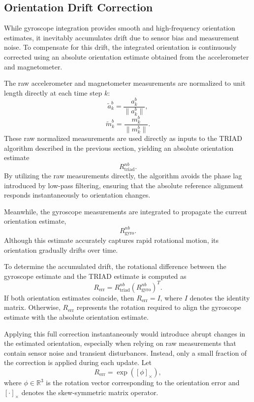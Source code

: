 \documentclass{article}
\begin{document}
\subsection{Orientation Drift Correction}

While gyroscope integration provides smooth and high-frequency orientation estimates, it inevitably accumulates drift due to sensor bias and measurement noise. To compensate for this drift, the integrated orientation is continuously corrected using an absolute orientation estimate obtained from the accelerometer and magnetometer.

The raw accelerometer and magnetometer measurements are normalized to unit length directly at each time step $k$:
\[
\tilde{a}_k^b = \frac{a_k^b}{\|a_k^b\|},
\]
\[
\tilde{m}_k^b = \frac{m_k^b}{\|m_k^b\|}.
\]
These raw normalized measurements are used directly as inputs to the TRIAD algorithm described in the previous section, yielding an absolute orientation estimate
\[
R_{\mathrm{triad}}^{nb}.
\]
By utilizing the raw measurements directly, the algorithm avoids the phase lag introduced by low-pass filtering, ensuring that the absolute reference alignment responds instantaneously to orientation changes.

Meanwhile, the gyroscope measurements are integrated to propagate the current orientation estimate,
\[
R_{\mathrm{gyro}}^{nb}.
\]
Although this estimate accurately captures rapid rotational motion, its orientation gradually drifts over time.

To determine the accumulated drift, the rotational difference between the gyroscope estimate and the TRIAD estimate is computed as
\[
R_{\mathrm{err}}
=
R_{\mathrm{triad}}^{nb}
\left(R_{\mathrm{gyro}}^{nb}\right)^T.
\]
If both orientation estimates coincide, then $R_{\mathrm{err}} = I$, where $I$ denotes the identity matrix. Otherwise, $R_{\mathrm{err}}$ represents the rotation required to align the gyroscope estimate with the absolute orientation estimate.

Applying this full correction instantaneously would introduce abrupt changes in the estimated orientation, especially when relying on raw measurements that contain sensor noise and transient disturbances. Instead, only a small fraction of the correction is applied during each update. Let
\[
R_{\mathrm{err}}
=
\exp([\phi]_\times),
\]
where $\phi \in \mathbb{R}^3$ is the rotation vector corresponding to the orientation error and $[\cdot]_\times$ denotes the skew-symmetric matrix operator. 
\end{document}
